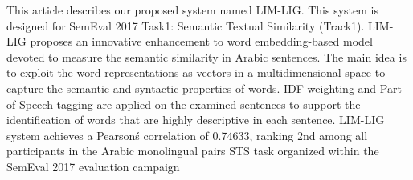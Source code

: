 This article describes our proposed system  named LIM-LIG. This system is designed for SemEval 2017 Task1: Semantic  Textual  Similarity (Track1). LIM-LIG  proposes  an  innovative  enhancement to word embedding-based model devoted  to    measure                                            the  semantic similarity in Arabic sentences. The  main  idea  is  to  exploit    the  word representations  as  vectors  in a  multidimensional  space    to    capture  the  semantic  and  syntactic properties  of                                              words. IDF weighting and Part-of-Speech                                tagging are applied  on  the  examined  sentences  to  support    the  identification  of words  that  are  highly  descriptive  in  each  sentence.  LIM-LIG system achieves a Pearson\'s correlation of 0.74633, ranking 2nd among all participants in the   Arabic monolingual pairs STS task organized within the SemEval 2017 evaluation campaign
